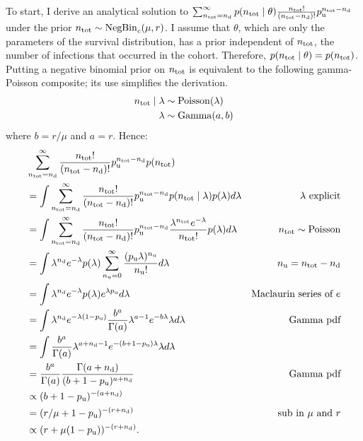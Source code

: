 \documentclass[thesis.tex]{subfiles}
\begin{document}
To start, I derive an analytical solution to $\sum_{n_\text{tot}=n_\text{d}}^\infty p(n_\text{tot} \mid \theta) \frac{n_\text{tot}!}{(n_\text{tot} - n_\text{d})!} p_\text{u}^{n_\text{tot} - n_\text{d}}$ under the prior $n_\text{tot} \sim \operatorname{NegBin}_{c}(\mu, r)$.
I assume that $\theta$, which are only the parameters of the survival distribution, has a prior independent of $n_\text{tot}$, the number of infections that occurred in the cohort.
Therefore, $p(n_\text{tot} \mid \theta) = p(n_\text{tot})$.
Putting a negative binomial prior on $n_\text{tot}$ is equivalent to the following gamma-Poisson composite; its use simplifies the derivation.
\begin{align}
n_\text{tot} \mid \lambda &\sim \operatorname{Poisson}(\lambda) \\
\lambda &\sim \operatorname{Gamma}(a, b)
\end{align}
where $b = r / \mu$ and $a = r$.
Hence:
\begin{align}
&\sum_{n_\text{tot}=n_\text{d}}^\infty \frac{n_\text{tot}!}{(n_\text{tot}-n_\text{d})!} p_\text{u}^{n_\text{tot}-n_\text{d}} p(n_\text{tot}) \\
&= \int \sum_{n_\text{tot}=n_\text{d}}^\infty \frac{n_\text{tot}!}{(n_\text{tot}-n_\text{d})!} p_\text{u}^{n_\text{tot}-n_\text{d}} p(n_\text{tot} \mid \lambda) p(\lambda) d\lambda &\text{$\lambda$ explicit}\\
&= \int \sum_{n_\text{tot}=n_\text{d}}^\infty \frac{n_\text{tot}!}{(n_\text{tot}-n_\text{d})!} p_\text{u}^{n_\text{tot}-n_\text{d}} \frac{\lambda^{n_\text{tot}} e^{-\lambda}}{n_\text{tot}!} p(\lambda) d\lambda &n_\text{tot} \sim \operatorname{Poisson}\\
&= \int \lambda^{n_\text{d}} e^{-\lambda} p(\lambda) \sum_{n_\text{u}=0}^\infty \frac{(p_\text{u} \lambda)^{n_\text{u}}}{n_\text{u}!} d\lambda &n_\text{u} = n_\text{tot}-n_\text{d}\\
&= \int \lambda^{n_\text{d}} e^{-\lambda} p(\lambda) e^{\lambda p_\text{u}} d\lambda &\text{Maclaurin series of $e$} \\
&= \int \lambda^{n_\text{d}} e^{-\lambda(1 - p_\text{u})} \frac{b^a}{\Gamma(a)} \lambda^{a-1} e^{-b\lambda} \lambda d\lambda &\text{Gamma pdf}\\
&= \int \frac{b^a}{\Gamma(a)} \lambda^{a+n_\text{d}-1} e^{-(b+1-p_\text{u})\lambda} \lambda d\lambda \\
&= \frac{b^a}{\Gamma(a)} \frac{\Gamma(a+n_\text{d})}{(b+1-p_\text{u})^{a+n_\text{d}}} &\text{Gamma pdf}\\
&\propto (b+1-p_\text{u})^{-(a+n_\text{d})} \\
&= (r/\mu + 1 - p_\text{u})^{-(r+n_\text{d})} &\text{sub in $\mu$ and $r$}\\
&\propto(r + \mu (1- p_\text{u}))^{-(r+n_\text{d})}.
\end{align}
\end{document}

